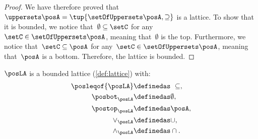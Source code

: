 \begin{proof}
	We have therefore proved that~$\uppersets \posA=\tup{\setOfUppersets \posA,\supseteq}$ is a lattice.
	To show that it is bounded, we notice that~$\emptyset \subseteq \setC$ for any~$\setC\in \setOfUppersets \posA$, meaning that~$\emptyset$ is the top.
	Furthermore, we notice that~$\setC\subseteq \posA$ for any~$\setC\in \setOfUppersets \posA$, meaning that~$\posA$ is a bottom.
	Therefore, the lattice is bounded.
\end{proof}

\begin{lemma}
	$\posLA$ is a bounded lattice (\cref{def:lattice}) with:
	\begin{equation}
		\begin{aligned}
			\posleqof{\posLA} & \definedas \ \subseteq, \\
			\posbot_{\posLA}  & \definedas \emptyset,   \\
			\postop_{\posLA}  & \definedas \posA,       \\
			\vee_{\posLA}     & \definedas \cup,        \\
			\wedge_{\posLA}   & \definedas \cap.
		\end{aligned}
	\end{equation}
\end{lemma}
